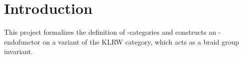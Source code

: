 
\chapter{Introduction}

This project formalizes the definition of \Ainf{}-categories and constructs an
\Ainf{}-endofunctor on a variant of the KLRW category, which acts as a braid group invariant.
